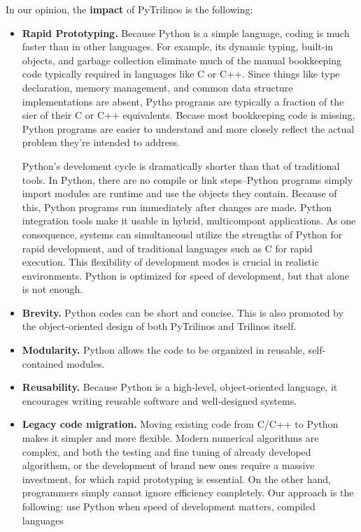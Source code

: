 \documentclass[10pt,relax]{SANDreport}
\begin{document}
In our opinion, the {\bf impact} of PyTrilinos is the following:
\begin{itemize}
\item {\bf Rapid Prototyping.}
Because Python is a simple language, coding is much faster than in other
  languages. For example, its dynamic typing, built-in objects, and garbage
  collection eliminate much of the manual bookkeeping code typically required
  in languages like C or C++. Since things like type declaration, memory
  management, and common data structure implementations are absent, Pytho
  programs are typically a fraction of the sier of their C or C++ equivalents.
  Becase most bookkeeping code is missing, Python programs are easier to
  understand and more closely reflect the actual problem they're intended to
  address. 

  Python's
  develoment cycle is dramatically shorter than that of traditional tools. In
  Python, there are no compile or link steps--Python programs simply import
  modules are runtime and use the objects they contain. Because of this,
Python programs run immediately after changes are made. Python integration
  tools make it usable in hybrid, multicompont applications. As one
  consequence, systems can simultaneousl utilize the strengths of Python for
  rapid development, and of traditional languages such as C for rapid
  execution.
  This flexibility of development modes is crucial in realistic environments.
  Python is optimized for speed of development, but that alone is not enough.
%
\item {\bf Brevity.} Python codes can be short and concise. This is also
promoted by the object-oriented design of both PyTrilinos and Trilinos itself.
%
\item {\bf Modularity.} Python allows the code to be organized in reusable,
  self-contained modules.
%
\item {\bf Reusability.} Because Python is a high-level, object-oriented
language, it encourages writing reusable software and well-designed systems.
%
\item {\bf Legacy code migration.} Moving existing code from C/C++ to Python
makes it simpler and more flexible.
Modern numerical
algorithms are complex, and both the testing and fine tuning of already
developed algorithsm, or the development of brand new ones require a massive
investment, for which rapid prototyping is essential. On the other hand,
programmers simply cannot ignore efficiency completely. Our approach is the
following: use Python when speed of development matters, compiled languages

\end{itemize}
\end{document}
